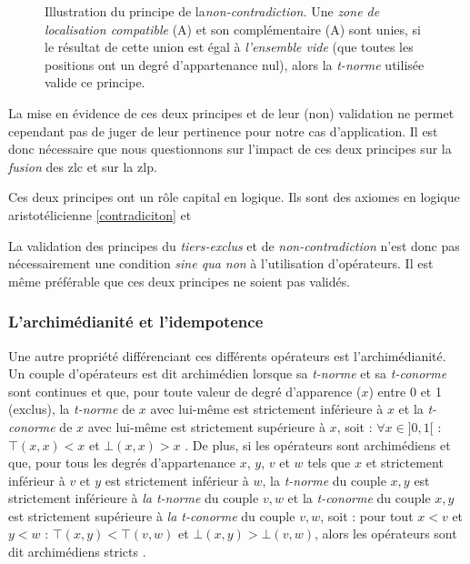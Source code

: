 \begin{figure}
  \centering
  
  \caption[Illustration du principe de la
  \emph{non-contradiction}]{Illustration du principe de
    la\emph{non-contradiction.}  Une \emph{zone de localisation
      compatible} (\textcolor{RdBu-9-1}{\textsf{A}}) et son
    complémentaire (\textcolor{RdBu-9-9}{\textsf{A}}) sont
    unies, si le résultat de cette union est égal à \emph{l'ensemble
      vide} (\ie que toutes les positions ont un degré d'appartenance
    nul), alors la \emph{t-norme} utilisée valide ce principe.}
  \label{fig:non-contradiction}
\end{figure}

La mise en évidence de ces deux principes et de leur (non) validation
ne permet cependant pas de juger de leur pertinence pour notre cas
d’application. Il est donc nécessaire que nous questionnons sur
l'impact de ces deux principes sur la \emph{fusion} des \ac{zlc} et
sur la \ac{zlp}.

Ces deux principes ont un rôle capital en logique. Ils sont des
axiomes en logique aristotélicienne \autoref{contradiciton} et 

La validation des principes du \emph{tiers-exclus} et de
\emph{non-contradiction} n'est donc pas nécessairement une condition
\emph{sine qua non} à l'utilisation d'opérateurs. Il est même
préférable que ces deux principes ne soient pas validés.

\subsubsection{L'archimédianité et l’idempotence}

Une autre propriété différenciant ces différents opérateurs est
l'archimédianité. Un couple d'opérateurs est dit archimédien lorsque
sa \emph{t-norme} et sa \emph{t-conorme} sont continues et que, pour
toute valeur de degré d’apparence (\(x\)) entre 0 et 1 (exclus), la
\emph{t-norme} de \(x\) avec lui-même est strictement inférieure à
\(x\) et la \emph{t-conorme} de \(x\) avec lui-même est strictement
supérieure à \(x\), soit : \(\forall x \in ]0,1[\) : \(⊤(x,x) < x\) et
\(⊥(x,x) > x\) \autocite{Bouchon-Meunier1995}. De plus, si les
opérateurs sont archimédiens et que, pour tous les degrés
d'appartenance \(x\), \(y\), \(v\) et \(w\) tels que \(x\) et
strictement inférieur à \(v\) et \(y\) est strictement inférieur à
\(w\), la \emph{t-norme} du couple \(x,y\) est strictement inférieure
à \emph{la t-norme} du couple \(v, w\) et la \emph{t-conorme} du
couple \(x,y\) est strictement supérieure à \emph{la t-conorme} du
couple \(v, w\), soit : pour tout \(x < v\) et \(y < w\) :
\(⊤(x,y) < ⊤(v,w)\) et \(⊥(x,y) > ⊥(v,w)\), alors les opérateurs sont
dit archimédiens stricts \autocite{Bouchon-Meunier1995}.

